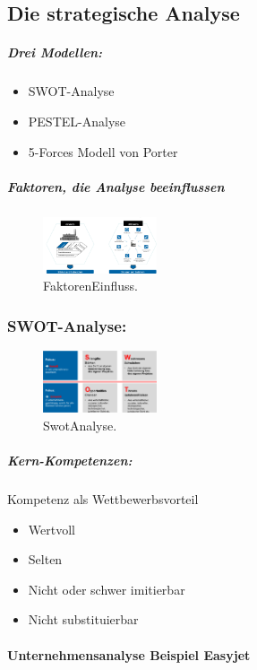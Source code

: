 \documentclass{article}
\begin{document}
\subsection{Die strategische Analyse}
\subparagraph{Drei Modellen:}
\begin{itemize}
\item SWOT-Analyse
\item PESTEL-Analyse
\item 5-Forces Modell von Porter
\end{itemize}

\subparagraph{Faktoren, die Analyse beeinflussen}
\begin{figure}
\centering
\includegraphics[width=0.3\textwidth]{Resources/Image/FaktorenEinfluss.png}
\caption{\label{fig:FaktorenEinfluss}FaktorenEinfluss.}
\end{figure}

\subsubsection{SWOT-Analyse:}
\begin{figure}
\centering
\includegraphics[width=0.3\textwidth]{Resources/Image/SwotAnalyse.png}
\caption{\label{fig:SwotAnalyse}SwotAnalyse.}
\end{figure}

\subparagraph{Kern-Kompetenzen:}

Kompetenz als Wettbewerbsvorteil
\begin{itemize}
\item Wertvoll
\item Selten
\item Nicht oder schwer imitierbar
\item Nicht substituierbar
\end{itemize}


\paragraph{Unternehmensanalyse Beispiel Easyjet \\ \\}
\end{document}
